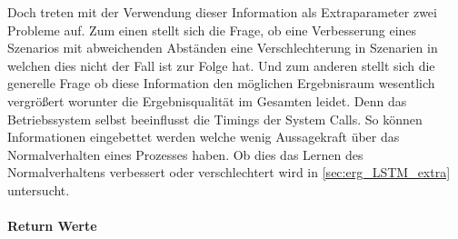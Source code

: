                     Doch treten mit der Verwendung dieser Information als Extraparameter zwei Probleme auf.
                    Zum einen stellt sich die Frage, ob eine Verbesserung eines Szenarios mit abweichenden Abständen eine Verschlechterung in Szenarien in welchen dies nicht der Fall ist zur Folge hat.
                    Und zum anderen stellt sich die generelle Frage ob diese Information den möglichen Ergebnisraum wesentlich vergrößert worunter die Ergebnisqualität im Gesamten leidet.
                    Denn das Betriebssystem selbst beeinflusst die Timings der System Calls.
                    So können Informationen eingebettet werden welche wenig Aussagekraft über das Normalverhalten eines Prozesses haben.
                    Ob dies das Lernen des Normalverhaltens verbessert oder verschlechtert wird in \autoref{sec:erg_LSTM_extra} untersucht.

                \paragraph{Return Werte}

